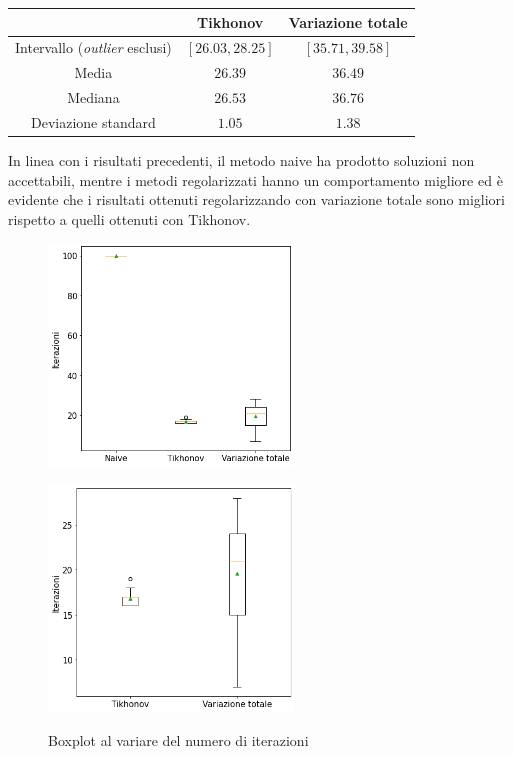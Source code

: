 \documentclass[11pt]{article}
\begin{document}
\begin{center}
    \begin{tabular}{ |c|c|c| }
    \hline
    & Tikhonov & Variazione totale \\ 
    \hline
    Intervallo (\emph{outlier} esclusi) & $[26.03, 28.25]$ & $[35.71, 39.58]$ \\
    Media & $26.39$ & $36.49$ \\
    Mediana & $26.53$ & $36.76$ \\
    Deviazione standard & $1.05$ & $1.38$ \\
    \hline
    \end{tabular}
\end{center}
In linea con i risultati precedenti, il metodo naive ha prodotto soluzioni non accettabili, 
mentre i metodi regolarizzati hanno un comportamento migliore ed è evidente che i risultati ottenuti regolarizzando con variazione totale sono migliori rispetto a quelli ottenuti con Tikhonov.\\

\begin{figure}[H]
    \centering
    \begin{minipage}{0.45\textwidth}
        \centering
        \includegraphics[width=6.5cm]{esecuzioni_multiple/100/iter1.png}
        \label{fig:100_iter1}
    \end{minipage}\hfill
    \begin{minipage}{0.45\textwidth}
        \centering
        \includegraphics[width=6.5cm]{esecuzioni_multiple/100/iter2.png}
        \label{fig:100_iter2}
    \end{minipage}
    \caption{Boxplot al variare del numero di iterazioni}
\end{figure}
\end{document}
